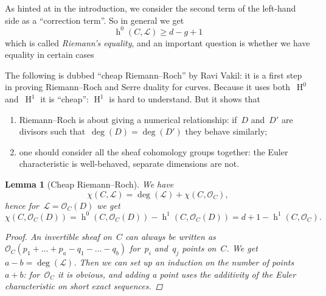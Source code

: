 \documentclass[10pt,a4paper]{article}
\theoremstyle{lecture}
\newtheorem{lemma}[theorem]{Lemma}
\DeclareMathOperator\hh{h}
\DeclareMathOperator\HH{H}
\begin{document}
As hinted at in the introduction, we consider the second term of the left-hand side as a ``correction term''. So in general we get
\begin{equation}
  \hh^0(C,\mathcal{L})\geq d-g+1
\end{equation}
which is called \emph{Riemann's equality}, and an important question is whether we have equality in certain cases

The following is dubbed ``cheap Riemann--Roch'' by Ravi Vakil: it is a first step in proving Riemann--Roch and Serre duality for curves. Because it uses both~$\HH^0$ and~$\HH^1$ it is ``cheap'': $\HH^1$ is hard to understand. But it shows that
\begin{enumerate}
  \item Riemann--Roch is about giving a numerical relationship: if~$D$ and~$D'$ are divisors such that~$\deg(D)=\deg(D')$ they behave similarly;
  \item one should consider all the sheaf cohomology groups together: the Euler characteristic is well-behaved, separate dimensions are not.
\end{enumerate}
\begin{lemma}[Cheap Riemann--Roch]
  \label{lemma:cheap-riemann-roch}
  We have
  \begin{equation}
    \chi(C,\mathcal{L})=\deg(\mathcal{L})+\chi(C,\mathcal{O}_C),
  \end{equation}
  hence for~$\mathcal{L}=\mathcal{O}_C(D)$ we get
  \begin{equation}
    \chi(C,\mathcal{O}_C(D))=\hh^0(C,\mathcal{O}_C(D))-\hh^1(C,\mathcal{O}_C(D))=d+1-\hh^1(C,\mathcal{O}_C).
  \end{equation}

  \begin{proof}
    An invertible sheaf on~$C$ can always be written as~$\mathcal{O}_C(p_1+\dotso+p_a-q_1-\dotso-q_b)$ for~$p_i$ and~$q_j$ points on~$C$. We get~$a-b=\deg(\mathcal{L})$. Then we can set up an induction on the number of points~$a+b$: for~$\mathcal{O}_C$ it is obvious, and adding a point uses the additivity of the Euler characteristic on short exact sequences.
  \end{proof}
\end{lemma}
\end{document}
